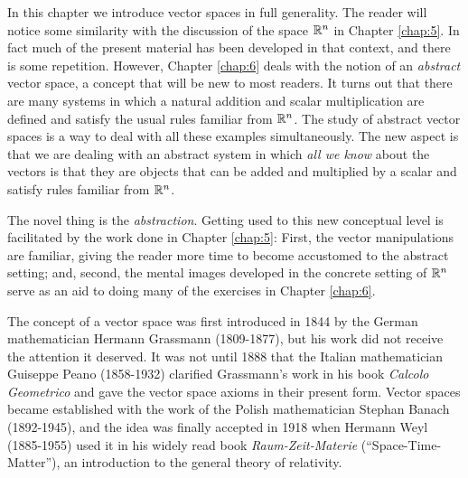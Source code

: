 \noindent In this chapter we introduce vector spaces in full generality. The reader will notice some similarity with the discussion of the space $\mathbb{R}^n$ in Chapter \ref{chap:5}. In fact much of the present material has been developed in that context, and there is some repetition. However, Chapter \ref{chap:6} deals with the notion of an \textit{abstract} vector space, a concept that will be new to most readers. It turns out that there are many systems in which a natural addition and scalar multiplication are defined and satisfy the usual rules familiar from $\mathbb{R}^n$. The study of abstract vector spaces is a way to deal with all these examples simultaneously. The new aspect is that we are dealing with an abstract system in which \textit{all we know} about the vectors is that they are objects that can be added and multiplied by a scalar and satisfy rules familiar from $\mathbb{R}^n$.

The novel thing is the \textit{abstraction}. Getting used to this new conceptual level is facilitated by the work done in Chapter \ref{chap:5}: First, the vector manipulations are familiar, giving the reader more time to become accustomed to the abstract setting; and, second, the mental images developed in the concrete setting of $\mathbb{R}^n$ serve as an aid to doing many of the exercises in Chapter \ref{chap:6}.

The concept of a vector space was first introduced in 1844 by the German mathematician Hermann Grassmann (1809-1877), but his work did not receive the attention it deserved. It was not until 1888 that the Italian mathematician Guiseppe Peano (1858-1932) clarified Grassmann's work in his book \textit{Calcolo Geometrico} and gave the vector space axioms in their present form. Vector spaces became established with the work of the Polish mathematician Stephan Banach (1892-1945), and the idea was finally accepted in 1918 when Hermann Weyl (1885-1955) used it in his widely read book \textit{Raum-Zeit-Materie} (``Space-Time-Matter''), an introduction to the general theory of relativity. 
